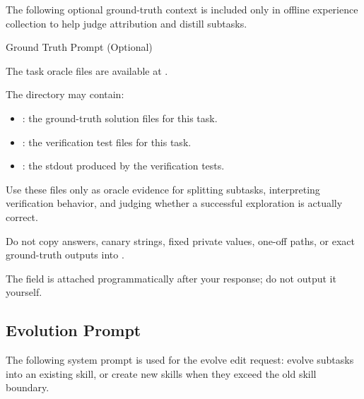 \noindent The following optional ground-truth context is included only in offline experience collection to help judge attribution and distill subtasks.\par

\begin{svpromptbox}{Ground Truth Prompt (Optional)}

The task oracle files are available at .\par
The directory may contain:\par
\smallskip
\begin{itemize}
\item {}: the ground-truth solution files for this task.
\item {}: the verification test files for this task.
\item {}: the stdout produced by the verification tests.
\end{itemize}
\smallskip
Use these files only as oracle evidence for splitting subtasks, interpreting verification behavior, and judging whether a successful exploration is actually correct.\par
Do not copy answers, canary strings, fixed private values, one-off paths, or exact ground-truth outputs into .\par
The  field is attached programmatically after your response; do not output it yourself.\par

\end{svpromptbox}

\subsection{Evolution Prompt}
\label{app:evolution-prompt}


\noindent The following system prompt is used for the evolve edit request: evolve subtasks into an existing skill, or create new skills when they exceed the old skill boundary.\par

